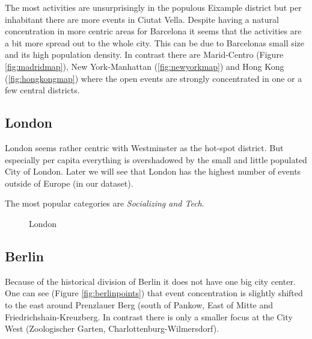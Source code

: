 The most activities are unsurprisingly in the populous Eixample district but per inhabitant there are more events in Ciutat Vella. Despite having a natural concentration in more centric areas for Barcelona it seems that the activities are a bit more spread out to the whole city. This can be due to Barcelonas small size and its high population density. 
In contrast there are Marid-Centro (Figure \ref{fig:madridmap}), New York-Manhattan (\ref{fig:newyorkmap}) and Hong Kong (\ref{fig:hongkongmap}) where the open events are strongly concentrated in one or a few central districts. 

\subsection*{London}

London seems rather centric with Westminster as the hot-spot district. But especially per capita everything is overshadowed by the small and little populated City of London. Later we will see that London has the highest number of events outside of Europe (in our dataset). 

The most popular categories are \emph{Socializing and Tech}. 

\begin{figure}[!htp]
	\hfill
	\caption{London}
\end{figure}


\subsection*{Berlin}

Because of the historical division of Berlin it does not have one big city center. One can see (Figure \ref{fig:berlinpoints}) that event concentration is slightly shifted to the east around Prenzlauer Berg (south of Pankow, East of Mitte and Friedrichshain-Kreuzberg. In contrast there is only a smaller focus at the City West (Zoologischer Garten, Charlottenburg-Wilmersdorf). 

